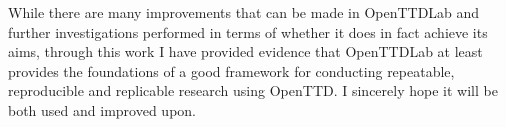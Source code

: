\documentclass[logo,msc,dsti]{infthesis}    %
\begin{document}
{While there are many improvements that can be made in OpenTTDLab and further investigations performed in terms of whether it does in fact achieve its aims, through this work I have provided evidence that OpenTTDLab at least provides the foundations of a good framework for conducting repeatable, reproducible and replicable research using OpenTTD. I sincerely hope it will be both used and improved upon.













}
\end{document}
